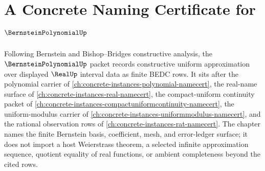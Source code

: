 \chapter{A Concrete Naming Certificate for $\BernsteinPolynomialUp$}
\label{ch:concrete-instances-bernstein-polynomial-namecert}

Following Bernstein and Bishop--Bridges constructive analysis, the $\BernsteinPolynomialUp$ packet records constructive uniform approximation over displayed $\RealUp$ interval data as finite BEDC rows. It sits after the polynomial carrier of \autoref{ch:concrete-instances-polynomial-namecert}, the real-name surface of \autoref{ch:concrete-instances-real-namecert}, the compact-uniform continuity packet of \autoref{ch:concrete-instances-compactuniformcontinuity-namecert}, the uniform-modulus carrier of \autoref{ch:concrete-instances-uniformmodulus-namecert}, and the rational observation rows of \autoref{ch:concrete-instances-rat-namecert}. The chapter names the finite Bernstein basis, coefficient, mesh, and error-ledger surface; it does not import a host Weierstrass theorem, a selected infinite approximation sequence, quotient equality of real functions, or ambient completeness beyond the cited rows.

